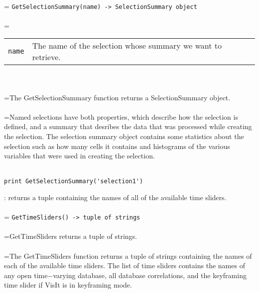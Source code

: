 \documentclass[10pt,a4paper]{report}
\begin{document}
 \\ 
\hangindent=\parindent 
\verb!GetSelectionSummary(name) -> SelectionSummary object!\\ [-3mm]

 \\ 
\hangindent=\parindent 
\begin{tabular}{lp{9cm}}
\verb!name! & The name of the selection whose summary we want to retrieve. \\
\end{tabular} \\[-2mm]


 \\ 
\hangindent=\parindent The GetSelectionSummary function returns a SelectionSummary object. \\[-3mm] 

 \\ 
\hangindent=\parindent Named selections have both properties, which describe how the selection is defined, and a summary that desribes the data that was processed while creating the selection. The selection summary object contains some statistics about the selection such as how many cells it contains and histograms of the various variables that were used in creating the selection. \\[-3mm] 

\\[-6mm]
\begin{verbatim}print GetSelectionSummary('selection1')
\end{verbatim}
\newpage


{}
: returns a tuple containing the names of all of the available time sliders.\\[-3mm]

 \\ 
\hangindent=\parindent 
\verb!GetTimeSliders() -> tuple of strings!\\ [-3mm]

 \\ 
\hangindent=\parindent GetTimeSliders returns a tuple of strings. \\[-3mm] 

 \\ 
\hangindent=\parindent The GetTimeSliders function returns a tuple of strings containing the names of each of the available time sliders. The list of time sliders contains the names of any open time$-$varying database, all database correlations, and the keyframing time slider if VisIt is in keyframing mode. \\[-3mm] 
\end{document}
